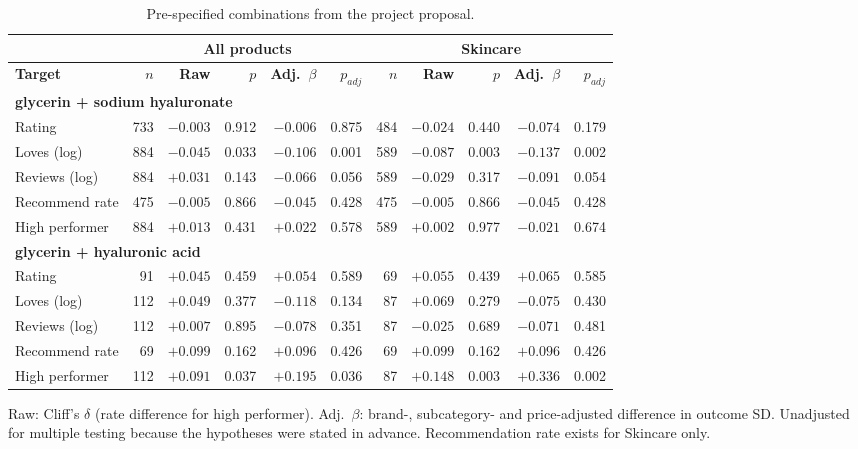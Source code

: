 \begin{table}[htbp]
\centering
\small
\begin{tabular}{|l|r|r|r|r|r|r|r|r|r|r|}
\hline
\rowcolor{headfill} \multicolumn{1}{|c|}{} & \multicolumn{5}{c|}{\textbf{All products}} & \multicolumn{5}{c|}{\textbf{Skincare}} \\
\hline
\rowcolor{headfill} \textbf{Target} & \textbf{$n$} & \textbf{Raw} & \textbf{$p$} & \textbf{Adj.\ $\beta$} & \textbf{$p_{adj}$} & \textbf{$n$} & \textbf{Raw} & \textbf{$p$} & \textbf{Adj.\ $\beta$} & \textbf{$p_{adj}$} \\
\hline
\multicolumn{11}{|l|}{\cellcolor{groupfill}\textbf{glycerin + sodium hyaluronate}} \\
\hline
Rating & 733 & $-0.003$ & 0.912 & $-0.006$ & 0.875 & 484 & $-0.024$ & 0.440 & $-0.074$ & 0.179 \\
\hline
Loves (log) & 884 & $-0.045$ & 0.033 & $-0.106$ & 0.001 & 589 & $-0.087$ & 0.003 & $-0.137$ & 0.002 \\
\hline
Reviews (log) & 884 & $+0.031$ & 0.143 & $-0.066$ & 0.056 & 589 & $-0.029$ & 0.317 & $-0.091$ & 0.054 \\
\hline
Recommend rate & 475 & $-0.005$ & 0.866 & $-0.045$ & 0.428 & 475 & $-0.005$ & 0.866 & $-0.045$ & 0.428 \\
\hline
High performer & 884 & $+0.013$ & 0.431 & $+0.022$ & 0.578 & 589 & $+0.002$ & 0.977 & $-0.021$ & 0.674 \\
\hline
\multicolumn{11}{|l|}{\cellcolor{groupfill}\textbf{glycerin + hyaluronic acid}} \\
\hline
Rating & 91 & $+0.045$ & 0.459 & $+0.054$ & 0.589 & 69 & $+0.055$ & 0.439 & $+0.065$ & 0.585 \\
\hline
Loves (log) & 112 & $+0.049$ & 0.377 & $-0.118$ & 0.134 & 87 & $+0.069$ & 0.279 & $-0.075$ & 0.430 \\
\hline
Reviews (log) & 112 & $+0.007$ & 0.895 & $-0.078$ & 0.351 & 87 & $-0.025$ & 0.689 & $-0.071$ & 0.481 \\
\hline
Recommend rate & 69 & $+0.099$ & 0.162 & $+0.096$ & 0.426 & 69 & $+0.099$ & 0.162 & $+0.096$ & 0.426 \\
\hline
High performer & 112 & $+0.091$ & 0.037 & $+0.195$ & 0.036 & 87 & $+0.148$ & 0.003 & $+0.336$ & 0.002 \\
\hline
\end{tabular}
\par\smallskip
\parbox{0.95\linewidth}{\footnotesize Raw: Cliff's $\delta$ (rate difference for high performer). Adj.\ $\beta$: brand-, subcategory- and price-adjusted difference in outcome SD. Unadjusted for multiple testing because the hypotheses were stated in advance. Recommendation rate exists for Skincare only.}
\caption{Pre-specified combinations from the project proposal.}
\label{tab:prespecified}
\end{table}
